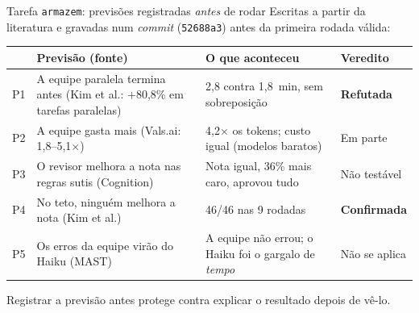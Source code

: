 \documentclass[11pt,aspectratio=169]{beamer}
\begin{document}
\begin{frame}{Tarefa \texttt{armazem}: previsões registradas \emph{antes} de rodar}
\small
Escritas a partir da literatura e gravadas num \emph{commit} (\texttt{52688a3}) antes da primeira rodada válida:
\vspace{0.4em}

\footnotesize
\begin{tabularx}{\linewidth}{@{}l X X l@{}}
\toprule
& Previsão (fonte) & O que aconteceu & Veredito \\
\midrule
P1 & A equipe paralela termina antes (Kim et al.: +80,8\% em tarefas paralelas) & 2,8 contra 1,8~min, sem sobreposição & \textcolor{ruim}{\textbf{Refutada}} \\
P2 & A equipe gasta mais (Vals.ai: 1,8--5,1$\times$) & 4,2$\times$ os tokens; custo igual (modelos baratos) & \textcolor{alerta!80!black}{Em parte} \\
P3 & O revisor melhora a nota nas regras sutis (Cognition) & Nota igual, 36\% mais caro, aprovou tudo & Não testável \\
P4 & No teto, ninguém melhora a nota (Kim et al.) & 46/46 nas 9 rodadas & \textcolor{ok}{\textbf{Confirmada}} \\
P5 & Os erros da equipe virão do Haiku (MAST) & A equipe não errou; o Haiku foi o gargalo de \emph{tempo} & Não se aplica \\
\bottomrule
\end{tabularx}
\vspace{0.5em}

{\small Registrar a previsão antes protege contra explicar o resultado depois de vê-lo.}
\end{frame}
\end{document}
